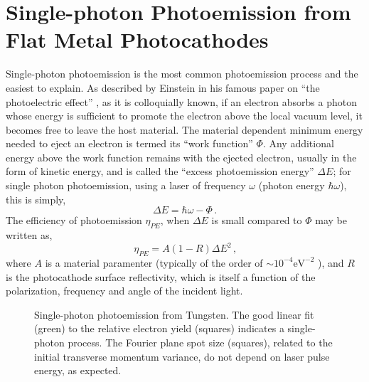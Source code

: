 
\section{Single-photon Photoemission from Flat Metal Photocathodes} \label{sec:single_photon}

Single-photon photoemission is the most common photoemission process and the easiest to explain.
As described by Einstein in his famous paper on ``the photoelectric effect'' \cite{einstein_uber_1905}, as it is colloquially known, if an electron absorbs a photon whose energy is sufficient to promote the electron above the local vacuum level, it becomes free to leave the host material.
The material dependent minimum energy needed to eject an electron is termed its ``work function'' $\Phi$.
Any additional energy above the work function remains with the ejected electron, usually in the form of kinetic energy, and is called the ``excess photoemission energy'' $\Delta E$; for single photon photoemission, using a laser of frequency $\omega$ (photon energy $\hbar \omega$), this is simply,
\begin{equation}
  \Delta E = \hbar \omega - \Phi \,\text{.}
\end{equation}
The efficiency of photoemission $\eta_{{\scriptscriptstyle PE}}$, when $\Delta E$ is small compared to $\Phi$ may be written as, %
\begin{equation}
  \eta_{{\scriptscriptstyle PE}} = A ( 1 - R ) \Delta E^2 \,\text{,}
\end{equation}
where $A$ is a material paramenter (typically of the order of $\sim 10^{-4} \text{eV}^{-2}$ %
), and $R$ is the photocathode surface reflectivity, which is itself a function of the polarization, frequency and angle of the incident light.

\begin{figure}
  \centering
  
  \caption[Single-photon photoemission from Tungsten]{
    Single-photon photoemission from Tungsten.
    The good linear fit (green) to the relative electron yield (squares) indicates a single-photon process.
    The Fourier plane spot size (squares), related to the initial transverse momentum variance, do not depend on laser pulse energy, as expected.
  }
  \label{fig:single_photon_tungsten}
\end{figure}

